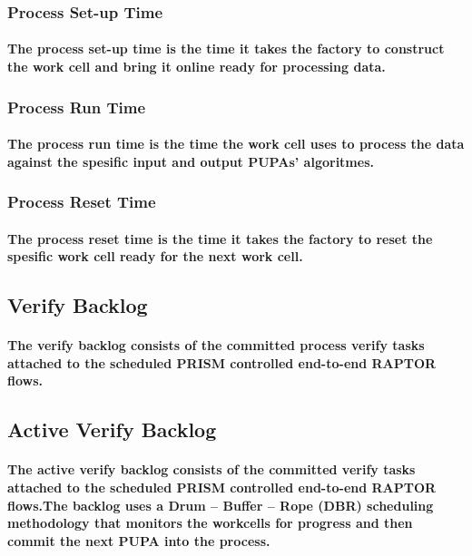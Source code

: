 \documentclass{acm_proc_article-sp}
\begin{document}
\subsubsection{\textbf{Process Set-up Time}}
\paragraph{The process set-up time is the time it takes the factory to construct the work cell and bring it online ready for processing data.}
\subsubsection{\textbf{Process Run Time}}
\paragraph{The process run time is the time the work cell uses to process the data against the spesific input and output PUPAs' algoritmes.}
\subsubsection{\textbf{Process Reset Time}}
\paragraph{The process reset time is the time it takes the factory to reset the spesific work cell ready for the next work cell.}
\subsection{Verify Backlog}
\paragraph{The verify backlog consists of the committed process verify tasks attached to the scheduled PRISM controlled end-to-end RAPTOR flows.}
\subsection{Active Verify Backlog}
\paragraph{The active verify backlog consists of the committed verify tasks attached to the scheduled PRISM controlled end-to-end RAPTOR flows.The backlog uses a Drum – Buffer – Rope (DBR) scheduling methodology \cite{daniel1997scheduling} that monitors the workcells for progress and then commit the next PUPA into the process.}
\end{document}
